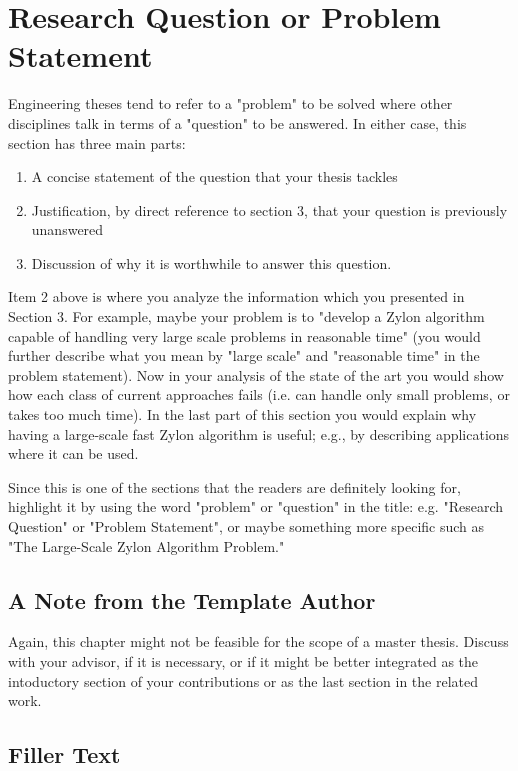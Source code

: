 \chapter{Research Question or Problem Statement}
\label{chap:problemstatement}
Engineering theses tend to refer to a "problem" to be solved where other
disciplines talk in terms of a "question" to be answered. In either case, this
section has three main parts:

\begin{enumerate}
    \item A concise statement of the question that your thesis tackles
    \item Justification, by direct reference to section 3, that your question is previously unanswered
    \item Discussion of why it is worthwhile to answer this question.
\end{enumerate}

Item 2 above is where you analyze the information which you presented in
Section 3. For example, maybe your problem is to "develop a Zylon algorithm
capable of handling very large scale problems in reasonable time" (you would
further describe what you mean by "large scale" and "reasonable time" in the
problem statement). Now in your analysis of the state of the art you would
show how each class of current approaches fails (i.e. can handle only small
problems, or takes too much time). In the last part of this section you would
explain why having a large-scale fast Zylon algorithm is useful; e.g., by
describing applications where it can be used.

Since this is one of the sections that the readers are definitely looking for,
highlight it by using the word "problem" or "question" in the title: e.g.
"Research Question" or "Problem Statement", or maybe something more specific
such as "The Large-Scale Zylon Algorithm Problem." 

\section{A Note from the Template Author}
Again, this chapter might not be feasible for the scope of a master thesis.
Discuss with your advisor, if it is necessary, or if it might be better
integrated as the intoductory section of your contributions or as the last
section in the related work.

\section{Filler Text}
\blindtext
\blindtext
\blindenumerate
\blindtext
\blinddescription
\blindtext

